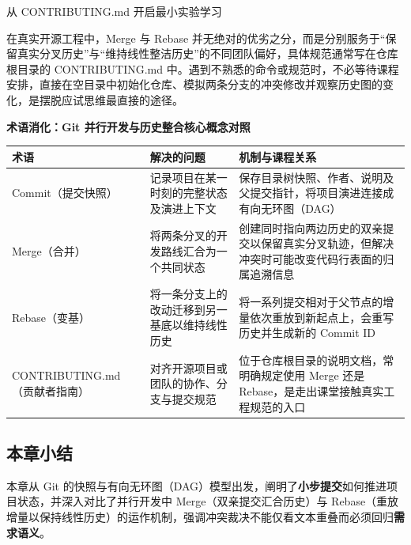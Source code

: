 \documentclass[UTF8,a4paper,11pt,fontset=fandol]{ctexart}
\begin{document}
\begin{knowledgebox}{从 CONTRIBUTING.md 开启最小实验学习}

在真实开源工程中，Merge 与 Rebase 并无绝对的优劣之分，而是分别服务于“保留真实分叉历史”与“维持线性整洁历史”的不同团队偏好，具体规范通常写在仓库根目录的 CONTRIBUTING.md 中。遇到不熟悉的命令或规范时，不必等待课程安排，直接在空目录中初始化仓库、模拟两条分支的冲突修改并观察历史图的变化，是摆脱应试思维最直接的途径。

\end{knowledgebox}

\par{}\textbf{术语消化：Git 并行开发与历史整合核心概念对照}

\begin{center}\small\begin{tabularx}{\linewidth}{YYY}

\toprule

术语 & 解决的问题 & 机制与课程关系\\\midrule

Commit（提交快照） & 记录项目在某一时刻的完整状态及演进上下文 & 保存目录树快照、作者、说明及父提交指针，将项目演进连接成有向无环图（DAG）\\[3pt]

Merge（合并） & 将两条分叉的开发路线汇合为一个共同状态 & 创建同时指向两边历史的双亲提交以保留真实分叉轨迹，但解决冲突时可能改变代码行表面的归属追溯信息\\[3pt]

Rebase（变基） & 将一条分支上的改动迁移到另一基底以维持线性历史 & 将一系列提交相对于父节点的增量依次重放到新起点上，会重写历史并生成新的 Commit ID\\[3pt]

CONTRIBUTING.md（贡献者指南） & 对齐开源项目或团队的协作、分支与提交规范 & 位于仓库根目录的说明文档，常明确规定使用 Merge 还是 Rebase，是走出课堂接触真实工程规范的入口\\[3pt]

\bottomrule\end{tabularx}\end{center}

\subsection{本章小结}

本章从 Git 的快照与有向无环图（DAG）模型出发，阐明了\textbf{小步提交}如何推进项目状态，并深入对比了并行开发中 Merge（双亲提交汇合历史）与 Rebase（重放增量以保持线性历史）的运作机制，强调冲突裁决不能仅看文本重叠而必须回归\textbf{需求语义}。
\end{document}
